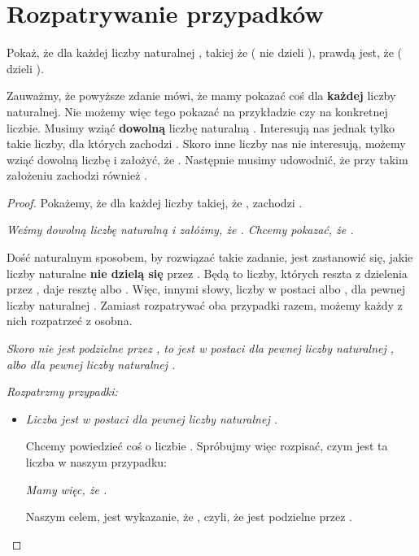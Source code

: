 \section{Rozpatrywanie przypadków}
\begin{example}
\label{example:cases-example}
Pokaż, że dla każdej liczby naturalnej , takiej że  ( nie dzieli ), prawdą jest, że  ( dzieli ).

Zauważmy, że powyższe zdanie mówi, że mamy pokazać coś dla \textbf{każdej} liczby naturalnej. Nie możemy więc tego pokazać na przykładzie czy na konkretnej liczbie. Musimy wziąć \textbf{dowolną} liczbę naturalną . Interesują nas jednak tylko takie liczby, dla których zachodzi . Skoro inne liczby nas nie interesują, możemy wziąć dowolną liczbę  i założyć, że . Następnie musimy udowodnić, że przy takim założeniu zachodzi również . 

\begin{proof}
Pokażemy, że dla każdej liczby  takiej, że , zachodzi .

\textit{Weźmy dowolną liczbę naturalną  i załóżmy, że . Chcemy pokazać, że .}

Dość naturalnym sposobem, by rozwiązać takie zadanie, jest zastanowić się, jakie liczby naturalne \textbf{nie dzielą się} przez . Będą to liczby, których reszta z dzielenia przez , daje resztę  albo . Więc, innymi słowy, liczby w postaci  albo , dla pewnej liczby naturalnej . Zamiast rozpatrywać oba przypadki razem, możemy każdy z nich rozpatrzeć z osobna. 

\textit{Skoro  nie jest podzielne przez , to  jest w postaci  dla pewnej liczby naturalnej , albo  dla pewnej liczby naturalnej .}

\textit{Rozpatrzmy przypadki:}
\begin{itemize}
    \item \textit{Liczba  jest w postaci  dla pewnej liczby naturalnej .}
    
    Chcemy powiedzieć coś o liczbie . Spróbujmy więc rozpisać, czym jest ta liczba w naszym przypadku:
    
    \textit{Mamy więc, że .}
    
    Naszym celem, jest wykazanie, że , czyli, że  jest podzielne przez .
    

\end{itemize}
\end{proof}
\end{example}
